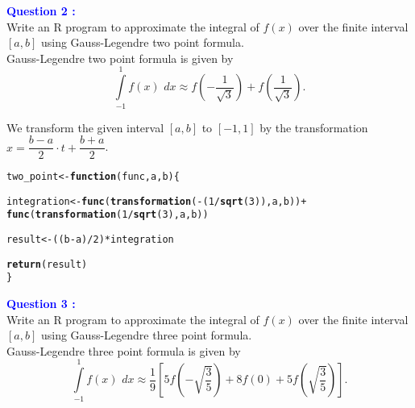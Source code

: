 \documentclass[11pt, a4paper]{article}\usepackage[]{graphicx}\usepackage[]{xcolor}
\makeatletter
\newcommand{\hlnum}[1]{\textcolor[rgb]{0.686,0.059,0.569}{#1}}%
\newcommand{\hlopt}[1]{\textcolor[rgb]{0,0,0}{#1}}%
\newcommand{\hldef}[1]{\textcolor[rgb]{0.345,0.345,0.345}{#1}}%
\newcommand{\hlkwa}[1]{\textcolor[rgb]{0.161,0.373,0.58}{\textbf{#1}}}%
\newcommand{\hlkwb}[1]{\textcolor[rgb]{0.69,0.353,0.396}{#1}}%
\newcommand{\hlkwc}[1]{\textcolor[rgb]{0.333,0.667,0.333}{#1}}%
\newcommand{\hlkwd}[1]{\textcolor[rgb]{0.737,0.353,0.396}{\textbf{#1}}}%
\newenvironment{kframe}{%
 \def\at@end@of@kframe{}%
 \ifinner\ifhmode%
  \def\at@end@of@kframe{\end{minipage}}%
  \begin{minipage}{\columnwidth}%
 \fi\fi%
 \def\FrameCommand##1{\hskip\@totalleftmargin \hskip-\fboxsep
 \colorbox{shadecolor}{##1}\hskip-\fboxsep
     \hskip-\linewidth \hskip-\@totalleftmargin \hskip\columnwidth}%
 \MakeFramed {\advance\hsize-\width
   \@totalleftmargin\z@ \linewidth\hsize
   \@setminipage}}%
 {\par\unskip\endMakeFramed%
 \at@end@of@kframe}
\newenvironment{knitrout}{}{} %
\makeatother
\begin{document}
\smallpencil \hspace{0.2cm} \textcolor{blue}{\textbf{Question 2 : }} \\

\hspace{1cm} Write an R program to approximate the integral of $f(x)$ over the finite interval $[a, b]$ using Gauss-Legendre two point formula. \\

\faArrowAltCircleRight[regular] \hspace{0.2cm} Gauss-Legendre two point formula is given by $$\int \limits_{-1}^{1} f(x) \,\, dx \approx f\left(-\dfrac{1}{\sqrt{3}}\right) + f\left(\dfrac{1}{\sqrt{3}}\right). $$

We transform the given interval $\left[ a, b \right]$ to $\left[ -1, 1 \right]$ by the transformation $x = \dfrac{b - a}{2} \cdot t + \dfrac{b + a}{2}$.

\begin{knitrout}
\color{fgcolor}\begin{kframe}
\begin{alltt}
\hldef{two_point} \hlkwb{<-} \hlkwa{function}\hldef{(}\hlkwc{func}\hldef{,} \hlkwc{a}\hldef{,} \hlkwc{b}\hldef{)\{}

  \hldef{integration} \hlkwb{<-} \hlkwd{func}\hldef{(}\hlkwd{transformation}\hldef{(}\hlopt{-}\hldef{(}\hlnum{1} \hlopt{/} \hlkwd{sqrt}\hldef{(}\hlnum{3}\hldef{)), a, b))} \hlopt{+}
                 \hlkwd{func}\hldef{(}\hlkwd{transformation}\hldef{(}\hlnum{1} \hlopt{/} \hlkwd{sqrt}\hldef{(}\hlnum{3}\hldef{), a, b))}

  \hldef{result} \hlkwb{<-} \hldef{( (b} \hlopt{-} \hldef{a)} \hlopt{/} \hlnum{2} \hldef{)} \hlopt{*} \hldef{integration}

  \hlkwd{return}\hldef{(result)}
\hldef{\}}
\end{alltt}
\end{kframe}
\end{knitrout}

\smallpencil \hspace{0.2cm} \textcolor{blue}{\textbf{Question 3 : }} \\

\hspace{1cm} Write an R program to approximate the integral of $f(x)$ over the finite interval $[a, b]$ using Gauss-Legendre three point formula. \\

\faArrowAltCircleRight[regular] \hspace{0.2cm} Gauss-Legendre three point formula is given by $$\int \limits_{-1}^{1} f(x) \,\, dx \approx \dfrac{1}{9} \left[ 5 f\left( - \sqrt{\dfrac{3}{5}}\right) + 8 f(0) + 5 f\left(  \sqrt{\dfrac{3}{5}}\right) \right]. $$
\end{document}
